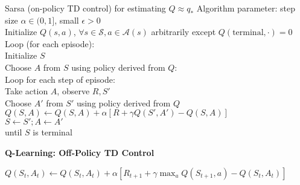 \documentclass[twocolumn]{article}
\begin{document}
\begin{mydef}{Sarsa (on-policy TD control) for estimating $Q \approx q_*$}{}
    Algorithm parameter: step size $\alpha \in (0, 1]$, small $\epsilon > 0$ \\
    Initialize $Q(s,a)$, $\forall s \in \mathcal S, a \in \mathcal A(s)$ arbitrarily except $Q(\text{terminal}, \cdot) = 0$ \\
    
        Loop (for each episode): \\
            \hspace*{2em}Initialize $S$ \\
            \hspace*{2em}Choose $A$ from $S$ using policy derived from $Q$: \\
            \hspace*{2em}Loop for each step of episode: \\
                \hspace*{4em}Take action $A$, observe $R, S'$ \\
                \hspace*{4em}Choose $A'$ from $S'$ using policy derived from $Q$ \\
                \hspace*{4em}$Q(S,A) \leftarrow Q(S,A) + \alpha[R + \gamma Q(S', A') - Q(S, A)]$ \\
                \hspace*{4em}$S \leftarrow S'; A \leftarrow A'$ \\
            \hspace*{2em}until $S$ is terminal
\end{mydef}

\dotfill

\textbf{Q-Learning: Off-Policy TD Control}

$Q(S_t, A_t) \leftarrow Q(S_t, A_t) + \alpha [R_{t+1} + \gamma \max_a Q(S_{t+1}, a) - Q(S_t, A_t)]$
\end{document}
